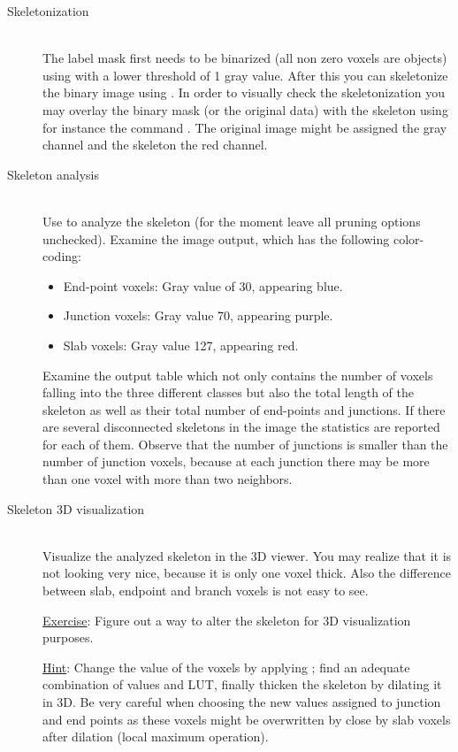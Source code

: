 \begin{description}
%
\item[Skeletonization]\hfill\\
%
The label mask first needs to be binarized (all non zero voxels are objects) using  with a lower threshold of 1 gray value. After this you can skeletonize the binary image using .  In order to visually check the skeletonization you may overlay the binary mask (or the original data) with the skeleton using for instance the command . The original image might be assigned the gray channel and the skeleton the red channel.
%
\item[Skeleton analysis]\hfill\\
Use  to analyze the skeleton (for the moment leave all pruning options unchecked). Examine the image output, which has the following color-coding:
\begin{itemize}
\item End-point voxels: Gray value of 30, appearing blue.
\item Junction voxels: Gray value 70, appearing purple.
\item Slab voxels: Gray value 127, appearing red.
\end{itemize}
Examine the output table which not only contains the number of voxels falling into the three different classes but also the total length of the skeleton as well as their total number of end-points and junctions. If there are several disconnected skeletons in the image the statistics are reported for each of them. Observe that the number of junctions is smaller than the number of junction voxels, because at each junction there may be more than one voxel with more than two neighbors.
%
\item[Skeleton 3D visualization]\hfill\\
%
Visualize the analyzed skeleton in the 3D viewer. You may realize that it is not looking very nice, because it is only one voxel thick. Also the difference between slab, endpoint and branch voxels is not easy to see. 

\underline{Exercise}: Figure out a way to alter the skeleton for 3D visualization purposes.

\underline{Hint}: Change the value of the voxels by applying ; find an adequate combination of values and LUT, finally thicken the skeleton by dilating it in 3D. Be very careful when choosing the new values assigned to junction and end points as these voxels might be overwritten by close by slab voxels after dilation (local maximum operation).
\end{description}

